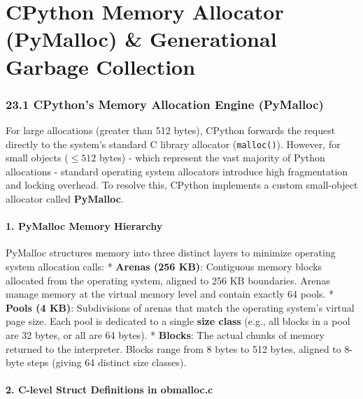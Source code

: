 \hypertarget{cpython-memory-allocator-pymalloc-generational-garbage-collection}{%
\chapter{CPython Memory Allocator (PyMalloc) \& Generational Garbage
Collection}\label{cpython-memory-allocator-pymalloc-generational-garbage-collection}}

\hypertarget{cpythons-memory-allocation-engine-pymalloc}{%
\subsection{23.1 CPython's Memory Allocation Engine
(PyMalloc)}\label{cpythons-memory-allocation-engine-pymalloc}}

For large allocations (greater than 512 bytes), CPython forwards the
request directly to the system's standard C library allocator
(\passthrough{\lstinline!malloc()!}). However, for small objects
(\(\le 512\) bytes) - which represent the vast majority of Python
allocations - standard operating system allocators introduce high
fragmentation and locking overhead. To resolve this, CPython implements
a custom small-object allocator called \textbf{PyMalloc}.

\hypertarget{pymalloc-memory-hierarchy}{%
\subsubsection{1. PyMalloc Memory
Hierarchy}\label{pymalloc-memory-hierarchy}}

PyMalloc structures memory into three distinct layers to minimize
operating system allocation calls: * \textbf{Arenas (256 KB)}:
Contiguous memory blocks allocated from the operating system, aligned to
256 KB boundaries. Arenas manage memory at the virtual memory level and
contain exactly 64 pools. * \textbf{Pools (4 KB)}: Subdivisions of
arenas that match the operating system's virtual page size. Each pool is
dedicated to a single \textbf{size class} (e.g., all blocks in a pool
are 32 bytes, or all are 64 bytes). * \textbf{Blocks}: The actual chunks
of memory returned to the interpreter. Blocks range from 8 bytes to 512
bytes, aligned to 8-byte steps (giving 64 distinct size classes).

\hypertarget{c-level-struct-definitions-in-obmalloc.c}{%
\subsubsection{2. C-level Struct Definitions in
obmalloc.c}\label{c-level-struct-definitions-in-obmalloc.c}}


